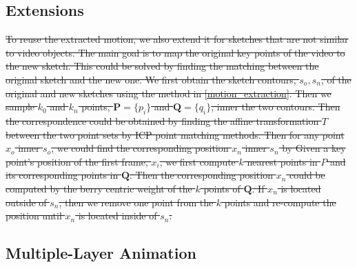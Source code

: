 \subsection{Extensions}

\sout{
To reuse the extracted motion, we also extend it for sketches that are not similar to video objects. The main goal is to map the original key points of the video to the new sketch. This could be solved by finding the matching between the original sketch and the new one. 
We first obtain the sketch contours, $ s_o, s_n $, of the original and new sketches using the method in \ref{motion_extraction}. Then we sample $ k_0 $ and $ k_n $  points, $ \textbf{P} = \{p_i\} $ and $ \textbf{Q} = \{q_i\} $, inner the two contours. Then the correspondence could be obtained by finding the affine transformation $ T $ between the two point sets by ICP point matching methods. Then for any point $ x_o $ inner $ s_o $, we could find the corresponding position $ x_n $ inner $ s_n $ by   Given a key point's position of the first frame, $ x_i $, we first compute $ k $ nearest points in $ P $ and its corresponding points in $ \textbf{Q} $. Then the corresponding position $ x_n $ could be computed by the berry centric weight of the $ k $ points of $ \textbf{Q} $. If $ x_n $ is located outside of $ s_n $, then we remove one point from the $ k $ points and re-compute the position until $ x_n $ is located inside of $ s_n $. }
\fi

\subsection{Multiple-Layer Animation}\label{sec:multi-layer_animation}

